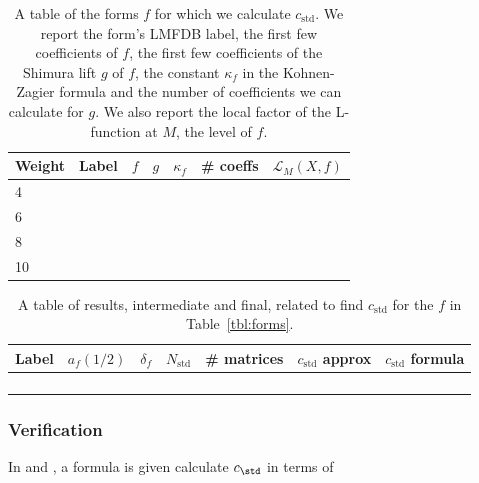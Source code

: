 \documentclass[11pt]{amsart}
\begin{document}
\begin{table}[h]
\centering
\begin{tabular}{l|rrrrrr}
Weight & Label & $f$ & $g$ & $\kappa_f$ & \# coeffs & $\mathscr{L}_M(X,f)$\\\hline
4 & & & & & \\
6 & & & & &\\
8 & & & & &\\
10 & & & & &\\\hline
\end{tabular}
\caption{A table of the forms $f$ for which we calculate $c_\text{std}$.  We report the form's LMFDB label, the first few coefficients of $f$, the first few coefficients of the Shimura lift $g$ of $f$, the constant $\kappa_f$ in the Kohnen-Zagier formula and the number of coefficients we can calculate for $g$.  We also report the local factor of the L-function at $M$, the level of $f$.}\label{tbl:triv-forms}
\end{table}


\begin{table}
\centering
\begin{tabular}{l|rrrrrr}
Label & $a_f(1/2)$ & $\delta_f$ & $N_\text{std}$ & \# matrices & $c_\text{std}$ approx & $c_\text{std}$ formula \\\hline
 & & & & & &\\
 & & & & & &\\
 & & & & & &\\
 & & & & & &\\\hline
\end{tabular}
\caption{A table of results, intermediate and final, related to find $c_\text{std}$ for the $f$ in Table~\ref{tbl:forms}.  }\label{tbl:results}
\end{table}

\subsubsection{Verification}

In \cite{bm} and \cite{DHKMS}, a formula is given calculate $c_\std$ in terms of 
\end{document}
